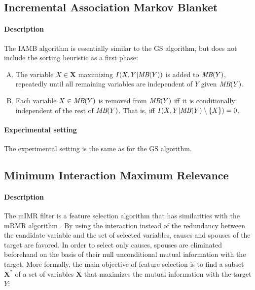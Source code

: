 \subsection{Incremental Association Markov Blanket}

\paragraph{Description} The IAMB algorithm \parencite{tsamardinos2003algorithms}
is essentially similar to the GS algorithm, but does not include the sorting
heuristic as a first phase:

\begin{enumerate}[A)]
    \item The variable $X\in\bm X$ maximizing $I(X, Y|\textit{MB}(Y))$ is added
    to $\textit{MB}(Y)$, repeatedly until all remaining variables are
    independent of $Y$ given $\textit{MB}(Y)$.
    \item Each variable $X\in\textit{MB}(Y)$ is removed from $\textit{MB}(Y)$
    iff it is conditionally independent of the rest of $\textit{MB}(Y)$. That
    is, iff $I(X, Y|\textit{MB}(Y)\setminus\{X\}) = 0$.
\end{enumerate}

\paragraph{Experimental setting} The experimental setting is the same as for
the GS algorithm.

\subsection{Minimum Interaction Maximum Relevance}

\paragraph{Description} The mIMR filter \parencite{bontempi2010causal} is a
feature selection algorithm that has similarities with the mRMR algorithm
\parencite{peng2005feature}. By using the interaction instead of the redundancy
between the candidate variable and the set of selected variables, causes and
spouses of the target are favored. In order to select only causes, spouses are
eliminated beforehand on the basis of their null unconditional mutual
information with the target. More formally, the main objective of feature
selection is to find a subset $\bm X^*$ of a set of variables $\bm X$ that
maximizes the mutual information with the target $Y$:

